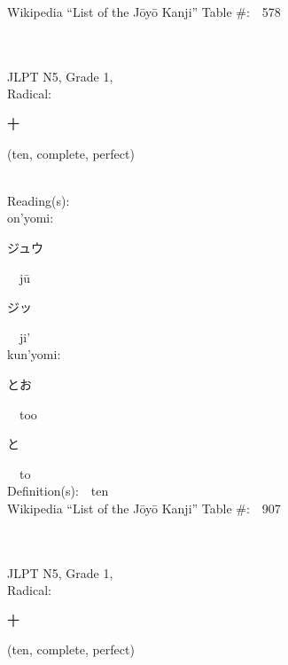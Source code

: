 \begin{multicols}{2}
Wikipedia ``List of the J\=oy\=o Kanji'' Table \#:\ \ 578 \\
\ \ \\
{\fontsize{34pt}{40pt}  }\ \ \\  %
{JLPT N5, Grade 1, \\Radical:\ \ {\begin{CJK}{UTF8}{min} 十 \end{CJK}} (ten, complete, perfect) } \\
Reading(s):\ \ \\
{\hspace*{1em}}on'yomi:\ \ \\
{\hspace*{2em}}{\begin{CJK}{UTF8}{min} ジュウ \end{CJK}}\ \ j\=u\ \ \\
{\hspace*{2em}}{\begin{CJK}{UTF8}{min} ジッ \end{CJK}}\ \ ji'\ \ \\
{\hspace*{1em}}kun'yomi:\ \ \\
{\hspace*{2em}}{\begin{CJK}{UTF8}{min} とお \end{CJK}}\ \ too\ \ \\
{\hspace*{2em}}{\begin{CJK}{UTF8}{min} と \end{CJK}}\ \ to\ \ \\
Definition(s):\ \ ten \\
Wikipedia ``List of the J\=oy\=o Kanji'' Table \#:\ \ 907 \\
\ \ \\
{\fontsize{34pt}{40pt}  }\ \ \\  %
{JLPT N5, Grade 1, \\Radical:\ \ {\begin{CJK}{UTF8}{min} 十 \end{CJK}} (ten, complete, perfect) } \\

\end{multicols}
